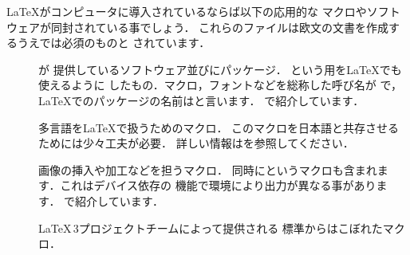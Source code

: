 {{\LaTeX}がコンピュータに導入されているならば以下の応用的な
マクロやソフトウェアが同封されている事でしょう．
これらのファイルは欧文の文書を作成するうえでは必須のものと
されています．%

\begin{description}
\item[{\Prog[AmSLaTeX]{\AmSLaTeX}}] 
  が
  提供しているソフトウェア並びにパッケージ．
  \Prog[AmSTeX]{\AmSTeX}という\prog{\TeX}用を{\LaTeX}でも使えるように
  したもの．マクロ，フォントなどを総称した呼び名が
  {\AmSLaTeX}で，\LaTeX でのパッケージの名前はと言います．
  で紹介しています．

\item[] 多言語を{\LaTeX}で扱うためのマクロ．
  このマクロを日本語と共存させるためには少々工夫が必要．
  詳しい情報はを参照してください．


\item[] 画像の挿入や加工などを担うマクロ．
同時にというマクロも含まれます．これはデバイス依存の
機能で環境により出力が異なる事があります．
で紹介しています．

\item[] {\LaTeX\,3}プロジェクトチームによって提供される
標準からはこぼれたマクロ．

\end{description}


}
